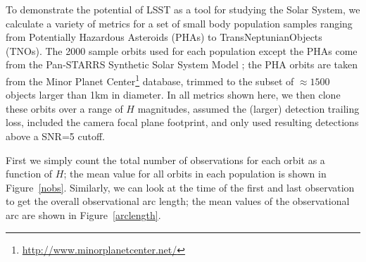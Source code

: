 \documentclass{iau}
\begin{document}
To demonstrate the potential of LSST as a tool for studying the
Solar System, we calculate a variety of metrics for a set of small
body population samples ranging from Potentially Hazardous Asteroids
(PHAs) to TransNeptunianObjects (TNOs). The 2000 sample orbits used for each
population except the PHAs come from the Pan-STARRS Synthetic Solar
System Model \cite{s3m}; the PHA orbits are taken from the Minor
Planet Center\footnote{\url{http://www.minorplanetcenter.net/}} database,
trimmed to the subset of $\approx1500$ objects larger than 1km in
diameter. In all metrics shown here, we then clone these orbits over a
range of $H$ magnitudes, assumed the (larger) detection trailing
loss, included the camera focal plane footprint, and only used
resulting detections above a SNR=5 cutoff.

First we simply count the total number of observations for each orbit
as a function of $H$; the mean value for all orbits in each population
is shown in Figure~\ref{nobs}. Similarly, we can look at the time of
the first and last observation to get the overall observational arc
length; the mean values  of the observational arc are shown in
Figure~\ref{arclength}.
\end{document}
